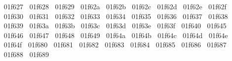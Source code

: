 {  ^^^^^^01f627%
  ^^^^^^01f628%
  ^^^^^^01f629%
  ^^^^^^01f62a%
  ^^^^^^01f62b%
  ^^^^^^01f62c%
  ^^^^^^01f62d%
  ^^^^^^01f62e%
  ^^^^^^01f62f%
  ^^^^^^01f630%
  ^^^^^^01f631%
  ^^^^^^01f632%
  ^^^^^^01f633%
  ^^^^^^01f634%
  ^^^^^^01f635%
  ^^^^^^01f636%
  ^^^^^^01f637%
  ^^^^^^01f638%
  ^^^^^^01f639%
  ^^^^^^01f63a%
  ^^^^^^01f63b%
  ^^^^^^01f63c%
  ^^^^^^01f63d%
  ^^^^^^01f63e%
  ^^^^^^01f63f%
  ^^^^^^01f640%
  ^^^^^^01f645%
  ^^^^^^01f646%
  ^^^^^^01f647%
  ^^^^^^01f648%
  ^^^^^^01f649%
  ^^^^^^01f64a%
  ^^^^^^01f64b%
  ^^^^^^01f64c%
  ^^^^^^01f64d%
  ^^^^^^01f64e%
  ^^^^^^01f64f%
  ^^^^^^01f680%
  ^^^^^^01f681%
  ^^^^^^01f682%
  ^^^^^^01f683%
  ^^^^^^01f684%
  ^^^^^^01f685%
  ^^^^^^01f686%
  ^^^^^^01f687%
  ^^^^^^01f688%
  ^^^^^^01f689%
}

